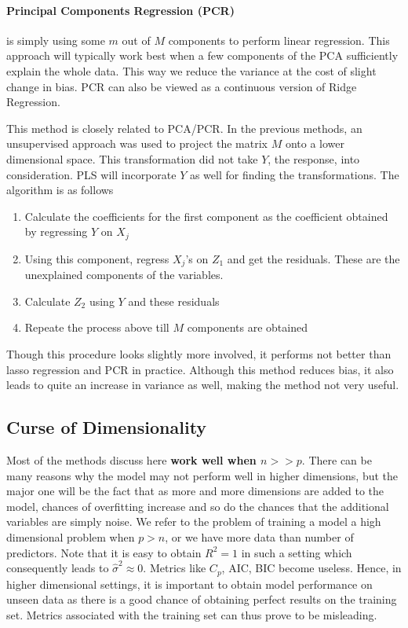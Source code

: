 \documentclass[11pt, a4paper]{article}
\begin{document}
    \paragraph{Principal Components Regression (PCR)}
    is simply using some $m$ out of $M$ components to perform linear regression. This approach will typically work best when a few components of the PCA sufficiently explain the whole data. This way we reduce the variance at the cost of slight change in bias. PCR can also be viewed as a continuous version of Ridge Regression.
    

    This method is closely related to PCA/PCR. In the previous methods, an unsupervised approach was used to project the matrix $M$ onto a lower dimensional space. This transformation did not take $Y$, the response, into consideration. PLS will incorporate $Y$ as well for finding the transformations.\newline
    The algorithm is as follows
    \begin{enumerate}
        \item Calculate the coefficients for the first component as the coefficient obtained by regressing $Y$ on $X_{j}$
        \item Using this component, regress $X_{j}$'s on $Z_{1}$ and get the residuals. These are the unexplained components of the variables.
        \item Calculate $Z_{2}$ using $Y$ and these residuals
        \item Repeate the process above till $M$ components are obtained
    \end{enumerate}

    Though this procedure looks slightly more involved, it performs not better than lasso regression and PCR in practice. Although this method reduces bias, it also leads to quite an increase in variance as well, making the method not very useful.

    \subsection{Curse of Dimensionality}
    Most of the methods discuss here \textbf{work well when $n >> p$}. There can be many reasons why the model may not perform well in higher dimensions, but the major one will be the fact that as more and more dimensions are added to the model, chances of overfitting increase and so do the chances that the additional variables are simply noise.\newline
    We refer to the problem of training a model a high dimensional problem when $p > n$, or we have more data than number of predictors. Note that it is easy to obtain $R^{2} = 1$ in such a setting which consequently leads to $\hat{\sigma}^{2} \approx 0$. Metrics like $C_{p}$, AIC, BIC become useless.\newline
    Hence, in higher dimensional settings, it is important to obtain model performance on unseen data as there is a good chance of obtaining perfect results on the training set. Metrics associated with the training set can thus prove to be misleading.
\end{document}
